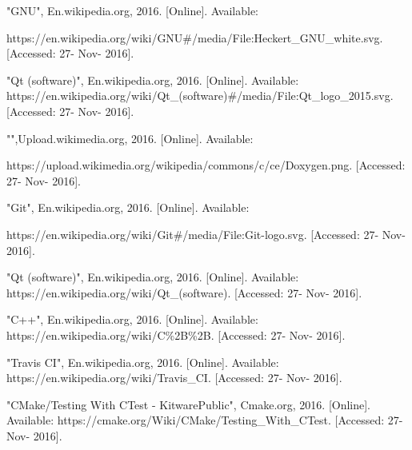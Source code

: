 \begin{thebibliography}{22}
\bibitem{} "GNU", En.wikipedia.org, 2016. [Online]. Available: 

https://en.wikipedia.org/wiki/GNU\#/media/File:Heckert\_GNU\_white.svg. [Accessed: 27- Nov- 2016].

\bibitem{} "Qt (software)", En.wikipedia.org, 2016. [Online]. Available: https://en.wikipedia.org/wiki/Qt\_(software)\#/media/File:Qt\_logo\_2015.svg. [Accessed: 27- Nov- 2016].


\bibitem{} "",Upload.wikimedia.org, 2016. [Online]. Available: 

https://upload.wikimedia.org/wikipedia/commons/c/ce/Doxygen.png. [Accessed: 27- Nov- 2016].


\bibitem{} "Git", En.wikipedia.org, 2016. [Online]. Available: 

https://en.wikipedia.org/wiki/Git\#/media/File:Git-logo.svg. [Accessed: 27- Nov- 2016].


\bibitem{}"Qt (software)", En.wikipedia.org, 2016. [Online]. Available: https://en.wikipedia.org/wiki/Qt\_(software). [Accessed: 27- Nov- 2016].

\bibitem{} "C++", En.wikipedia.org, 2016. [Online]. Available: https://en.wikipedia.org/wiki/C\%2B\%2B. [Accessed: 27- Nov- 2016].

\bibitem{}"Travis CI", En.wikipedia.org, 2016. [Online]. Available: https://en.wikipedia.org/wiki/Travis\_CI. [Accessed: 27- Nov- 2016].

\bibitem{} "CMake/Testing With CTest - KitwarePublic", Cmake.org, 2016. [Online]. Available: https://cmake.org/Wiki/CMake/Testing\_With\_CTest. [Accessed: 27- Nov- 2016].

\end{thebibliography}
